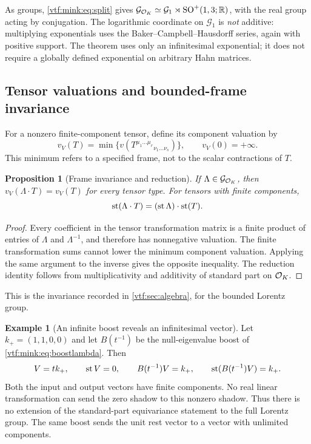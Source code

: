 \documentclass[11pt,letterpaper]{article}
\newtheorem{proposition}[theorem]{Proposition}
\theoremstyle{definition}
\newtheorem{example}[theorem]{Example}
\theoremstyle{remark}
\newcommand{\R}{\mathbb R}\newcommand{\C}{\mathbb C}
\newcommand{\SO}{\operatorname{SO}}\newcommand{\SL}{\operatorname{SL}}
\begin{document}
As groups, \cref{vtf:mink:eq:split} gives $\mathcal G_{\OO_K}\simeq \mathcal G_1\rtimes\SO^+(1,3;\R)$, with the real group acting by conjugation. The logarithmic coordinate on $\mathcal G_1$ is \emph{not} additive: multiplying exponentials uses the Baker--Campbell--Hausdorff series, again with positive support. The theorem uses only an infinitesimal exponential; it does not require a globally defined exponential on arbitrary Hahn matrices.

\subsection{Tensor valuations and bounded-frame invariance}
For a nonzero finite-component tensor, define its component valuation by
\begin{equation}\label{vtf:mink:eq:tensorval}
 v_V(T)=\min\{v(T^{\mu_1\ldots\mu_r}{}_{\nu_1\ldots\nu_s})\},
 \qquad v_V(0)=+\infty.
\end{equation}
This minimum refers to a specified frame, not to the scalar contractions of $T$.

\begin{proposition}[Frame invariance and reduction]\label{vtf:mink:prop:frame}
If $\Lambda\in \mathcal G_{\mathcal O_K}$, then $v_V(\Lambda\cdot T)=v_V(T)$ for every tensor type. For tensors with finite components,
\begin{equation}
 \operatorname{st}(\Lambda\cdot T)=(\operatorname{st}\Lambda)\cdot\operatorname{st}(T).
\end{equation}
\end{proposition}
\begin{proof}
Every coefficient in the tensor transformation matrix is a finite product of entries of $\Lambda$ and $\Lambda^{-1}$, and therefore has nonnegative valuation. The finite transformation sums cannot lower the minimum component valuation. Applying the same argument to the inverse gives the opposite inequality. The reduction identity follows from multiplicativity and additivity of standard part on $\mathcal O_K$.
\end{proof}

This is the invariance recorded in \cref{vtf:sec:algebra}, for the bounded
Lorentz group.

\begin{example}[An infinite boost reveals an infinitesimal vector]\label{vtf:mink:ex:boostshadow}
Let $k_+=(1,1,0,0)$ and let $B(t^{-1})$ be the null-eigenvalue boost of \cref{vtf:mink:eq:boostlambda}. Then
\begin{equation}
 V=t k_+,\qquad \operatorname{st} V=0,\qquad
 B(t^{-1})V=k_+,\qquad \operatorname{st}(B(t^{-1})V)=k_+.
\end{equation}
Both the input and output vectors have finite components. No real linear transformation can send the zero shadow to this nonzero shadow. Thus there is no extension of the standard-part equivariance statement to the full Lorentz group. The same boost sends the unit rest vector to a vector with unlimited components.
\end{example}
\end{document}
